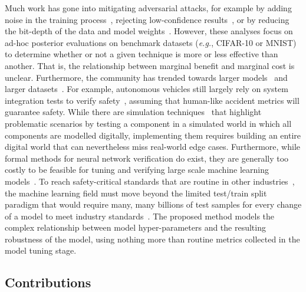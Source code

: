 Much work has gone into mitigating adversarial attacks, for example by adding noise in the training process~\cite{gauss_aug,gauss_out}, rejecting low-confidence results~\cite{high_conf}, or by reducing the bit-depth of the data and model weights~\cite{feature_squeezing}. 
However, these analyses focus on ad-hoc posterior evaluations on benchmark datasets (\textit{e.g.}, CIFAR-10 or MNIST) to determine whether or not a given technique is more or less effective than another. 
That is, the relationship between marginal benefit and marginal cost is unclear. 
Furthermore, the community has trended towards larger models~\cite{desislavov2021compute} and larger datasets~\cite{desislavov2021compute,bailly2022effects}. 
For example, autonomous vehicles still largely rely on system integration tests to verify safety~\cite{vehicle_testing_review}, assuming that human-like accident metrics will guarantee safety.  
While there are simulation techniques~\cite{vehicle_formal} that highlight problematic scenarios by testing a component in a simulated world in which all components are modelled digitally, implementing them requires building an entire digital world that can nevertheless miss real-world edge cases. 
Furthermore, while formal methods for neural network verification do exist, they are generally too costly to be feasible for tuning and verifying large scale machine learning models~\cite{formal_adversarial}.
To reach safety-critical standards that are routine in other industries~\cite{iso26262,IEC61508,IEC62034}, the machine learning field must move beyond the limited test/train split paradigm that would require many, many billions of test samples for every change of a model to meet industry standards~\cite{meyers}. 
The proposed method models the complex relationship between model hyper-parameters and the resulting robustness of the model, using nothing more than routine metrics collected in the model tuning stage.

\subsection{Contributions}

